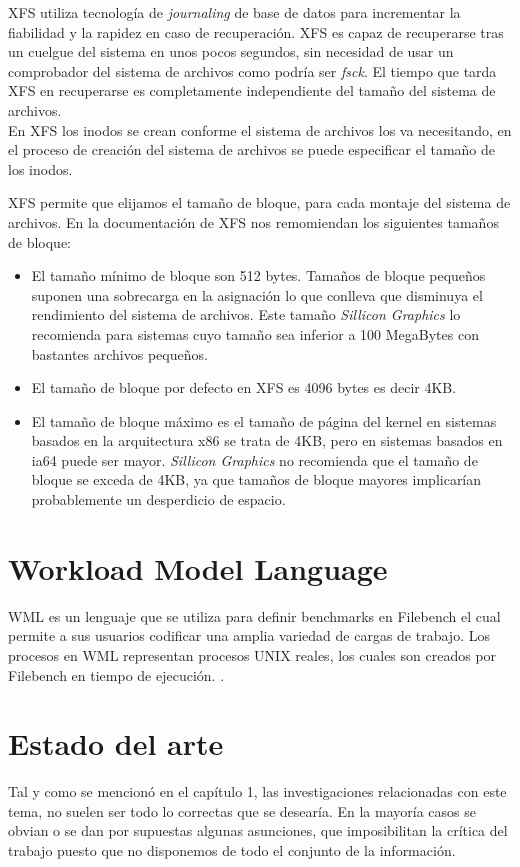 XFS utiliza tecnología de \textit{journaling} de base de datos para incrementar la fiabilidad y la rapidez en caso de recuperación. XFS es capaz de recuperarse tras un cuelgue del sistema en unos pocos segundos, sin necesidad de usar un comprobador del sistema de archivos como podría ser \textit{fsck}. El tiempo que tarda XFS en recuperarse es completamente independiente del tamaño del sistema de archivos.\\

En XFS los inodos se crean conforme el sistema de archivos los va necesitando, en el proceso de creación del sistema de archivos se puede especificar el tamaño de los inodos.

XFS permite que elijamos el tamaño de bloque, para cada montaje del sistema de archivos. En la documentación de XFS nos remomiendan los siguientes tamaños de bloque:
\begin{itemize}
    \item El tamaño mínimo de bloque son 512 bytes. Tamaños de bloque pequeños suponen una sobrecarga en la asignación lo que conlleva que disminuya el rendimiento del sistema de archivos. Este tamaño \textit{Sillicon Graphics} lo recomienda para sistemas cuyo tamaño sea inferior a 100 MegaBytes con bastantes archivos pequeños.
    
    \item El tamaño de bloque por defecto en XFS es 4096 bytes es decir 4KB.
    \item El tamaño de bloque máximo es el tamaño de página del kernel en sistemas basados en la arquitectura x86 se trata de 4KB, pero en sistemas basados en ia64 puede ser mayor. \textit{Sillicon Graphics} no recomienda que el tamaño de bloque se exceda de 4KB, ya que tamaños de bloque mayores implicarían probablemente un desperdicio de espacio.
\end{itemize}

\section{Workload Model Language}
WML es un lenguaje que se utiliza para definir benchmarks en Filebench el cual permite a sus usuarios codificar una amplia variedad de cargas de trabajo. Los procesos  en WML representan procesos UNIX reales, los cuales son creados por Filebench en tiempo de ejecución. \cite{Tarasov2016FilebenchAF}. 


\section{Estado del arte} \label{estado}
Tal y como se mencionó en el capítulo 1, las investigaciones relacionadas con este tema, no suelen ser todo lo correctas que se desearía. En la mayoría casos se obvian o se dan por supuestas algunas asunciones, que imposibilitan la crítica del trabajo puesto que no disponemos de todo el conjunto de la información. \\

